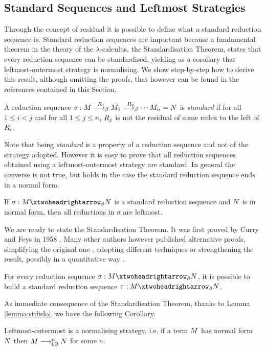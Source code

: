 \begin{THESIS}
	\subsection{Standard Sequences and Leftmost Strategies}
	Through the concept of residual it is possible to define what a standard reduction sequence is. Standard reduction sequences are important because a fundamental theorem in the theory of the $\lambda$-calculus, the Standardisation Theorem, states that every reduction sequence can be standardised, yielding as a corollary that leftmost-outermost strategy is normalising. We show step-by-step how to derive this result, although omitting the proofs, that however can be found in the references contained in this Section.  
	\begin{definition}
		A reduction sequence $\sigma:M\overset{R_1}{\longrightarrow_\beta}M_1\overset{R_2}{\longrightarrow_\beta}\cdots M_n=N$ is \emph{standard} if for all $1\leq i<j$ and for all $1\leq j\leq n$, $R_j$ is not the residual of some redex to the left of $R_i$.
	\end{definition}
	\begin{remark}
		Note that being \emph{standard} is a property of a reduction sequence and not of the strategy adopted. However it is easy to prove that all reduction sequences obtained using a leftmost-outermost strategy are standard. In general the converse is not true, but holds in the case the standard reduction sequence ends in a normal form.
	\end{remark}
	\begin{lemma}\label{lemma:stdislo}
		If $\sigma:\termone\redbetaclo\termtwo$ is a standard reduction sequence and $N$ is in normal form, then all reductions in $\sigma$ are leftmost.
	\end{lemma}
	We are ready to state the Standardisation Theorem. It was first proved by Curry and Feys in 1958 \cite{curry_combinatory_1958}. Many other authors however published alternative proofs, simplifying the original one \cite{mitschke_standardization_1979}, adopting different techniques \cite{klop_combinatory_1980} or strengthening the result, possibly in a quantitative way \cite{xi_upper_1999}.
	\begin{theorem}[Standardisation]
		For every reduction sequence $\sigma:\termone\redbetaclo\termtwo$, it is possible to build a standard reduction sequence $\tau:\termone\redbetaclo\termtwo$.
	\end{theorem}
	As immediate consequence of the Standardisation Theorem, thanks to Lemma \ref{lemma:stdislo}, we have the following Corollary.
	\begin{corollary}[Normalisation]
		Leftmost-outermost is a normalising strategy. i.e. if a term $M$ has normal form $N$ then $M\longrightarrow_{\textsf{LO}}^nN$ for some $n$.
	\end{corollary}
\end{THESIS}
